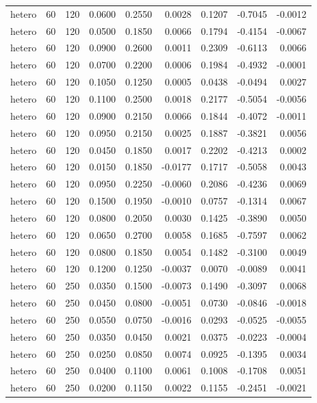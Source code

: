 \begin{tabular}{lrrrrrrrr}
hetero & 60 & 120 & 0.0600 & 0.2550 & 0.0028 & 0.1207 & -0.7045 & -0.0012 \\
hetero & 60 & 120 & 0.0500 & 0.1850 & 0.0066 & 0.1794 & -0.4154 & -0.0067 \\
hetero & 60 & 120 & 0.0900 & 0.2600 & 0.0011 & 0.2309 & -0.6113 & 0.0066 \\
hetero & 60 & 120 & 0.0700 & 0.2200 & 0.0006 & 0.1984 & -0.4932 & -0.0001 \\
hetero & 60 & 120 & 0.1050 & 0.1250 & 0.0005 & 0.0438 & -0.0494 & 0.0027 \\
hetero & 60 & 120 & 0.1100 & 0.2500 & 0.0018 & 0.2177 & -0.5054 & -0.0056 \\
hetero & 60 & 120 & 0.0900 & 0.2150 & 0.0066 & 0.1844 & -0.4072 & -0.0011 \\
hetero & 60 & 120 & 0.0950 & 0.2150 & 0.0025 & 0.1887 & -0.3821 & 0.0056 \\
hetero & 60 & 120 & 0.0450 & 0.1850 & 0.0017 & 0.2202 & -0.4213 & 0.0002 \\
hetero & 60 & 120 & 0.0150 & 0.1850 & -0.0177 & 0.1717 & -0.5058 & 0.0043 \\
hetero & 60 & 120 & 0.0950 & 0.2250 & -0.0060 & 0.2086 & -0.4236 & 0.0069 \\
hetero & 60 & 120 & 0.1500 & 0.1950 & -0.0010 & 0.0757 & -0.1314 & 0.0067 \\
hetero & 60 & 120 & 0.0800 & 0.2050 & 0.0030 & 0.1425 & -0.3890 & 0.0050 \\
hetero & 60 & 120 & 0.0650 & 0.2700 & 0.0058 & 0.1685 & -0.7597 & 0.0062 \\
hetero & 60 & 120 & 0.0800 & 0.1850 & 0.0054 & 0.1482 & -0.3100 & 0.0049 \\
hetero & 60 & 120 & 0.1200 & 0.1250 & -0.0037 & 0.0070 & -0.0089 & 0.0041 \\
hetero & 60 & 250 & 0.0350 & 0.1500 & -0.0073 & 0.1490 & -0.3097 & 0.0068 \\
hetero & 60 & 250 & 0.0450 & 0.0800 & -0.0051 & 0.0730 & -0.0846 & -0.0018 \\
hetero & 60 & 250 & 0.0550 & 0.0750 & -0.0016 & 0.0293 & -0.0525 & -0.0055 \\
hetero & 60 & 250 & 0.0350 & 0.0450 & 0.0021 & 0.0375 & -0.0223 & -0.0004 \\
hetero & 60 & 250 & 0.0250 & 0.0850 & 0.0074 & 0.0925 & -0.1395 & 0.0034 \\
hetero & 60 & 250 & 0.0400 & 0.1100 & 0.0061 & 0.1008 & -0.1708 & 0.0051 \\
hetero & 60 & 250 & 0.0200 & 0.1150 & 0.0022 & 0.1155 & -0.2451 & -0.0021 \\

\end{tabular}
